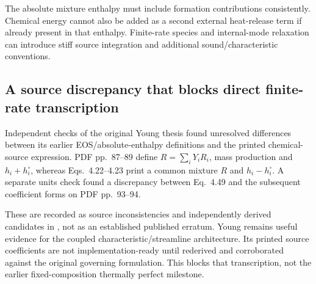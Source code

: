The absolute mixture enthalpy must include formation contributions
consistently. Chemical energy cannot also be added as a second external
heat-release term if already present in that enthalpy. Finite-rate
species and internal-mode relaxation can introduce stiff source
integration and additional sound/characteristic conventions.

\subsection{A source discrepancy that blocks direct finite-rate transcription}
Independent checks of the original Young thesis found unresolved
differences between its earlier EOS/absolute-enthalpy definitions and
the printed chemical-source expression. PDF pp.~87--89 define
\(R=\sum_iY_iR_i\), mass production and \(h_i+h_i^\circ\), whereas
Eqs.~4.22--4.23 print a common mixture \(R\) and
\(h_i-h_i^\circ\). A separate units check found a discrepancy between
Eq.~4.49 and the subsequent coefficient forms on PDF pp.~93--94.

These are recorded as source inconsistencies and independently derived
candidates in , not as an established
published erratum. Young remains useful evidence for the coupled
characteristic/streamline architecture. Its printed source coefficients
are not implementation-ready until rederived and corroborated against
the original governing formulation. This blocks that transcription,
not the earlier fixed-composition thermally perfect milestone.
